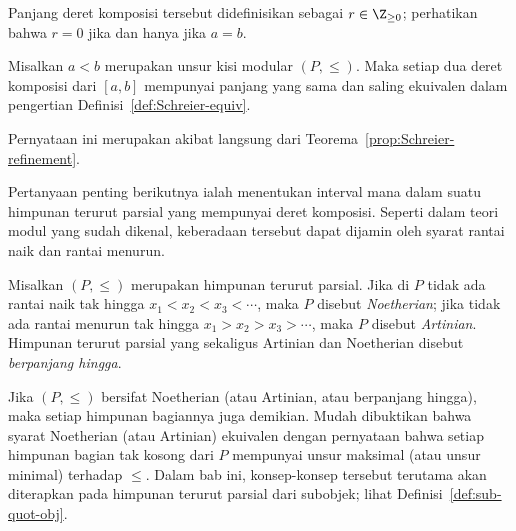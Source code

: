 Panjang deret komposisi tersebut didefinisikan sebagai $r \in \Z_{\geq 0}$;
perhatikan bahwa $r=0$ jika dan hanya jika $a=b$.

\begin{teorema}\label{prop:lattice-JH}
	Misalkan $a<b$ merupakan unsur kisi modular $(P,\leq)$. Maka setiap dua
	deret komposisi dari $[a,b]$ mempunyai panjang yang sama dan saling
	ekuivalen dalam pengertian Definisi~\ref{def:Schreier-equiv}.
\end{teorema}
\begin{bukti}
	Pernyataan ini merupakan akibat langsung dari
	Teorema~\ref{prop:Schreier-refinement}.
\end{bukti}

Pertanyaan penting berikutnya ialah menentukan interval mana dalam suatu
himpunan terurut parsial yang mempunyai deret komposisi. Seperti dalam teori modul yang
sudah dikenal, keberadaan tersebut dapat dijamin oleh syarat rantai naik dan
rantai menurun.

\begin{definisi}\label{def:lattice-Noether-Artin}
	Misalkan $(P,\leq)$ merupakan himpunan terurut parsial. Jika di $P$ tidak
	ada rantai naik tak hingga $x_1<x_2<x_3<\cdots$, maka $P$ disebut
	\emph{Noetherian}; jika tidak ada rantai menurun tak hingga
	$x_1>x_2>x_3>\cdots$, maka $P$ disebut \emph{Artinian}. Himpunan terurut
	parsial yang sekaligus Artinian dan Noetherian disebut
	\emph{berpanjang hingga}.
\end{definisi}

Jika $(P,\leq)$ bersifat Noetherian (atau Artinian, atau berpanjang hingga),
maka setiap himpunan bagiannya juga demikian. Mudah dibuktikan bahwa syarat
Noetherian (atau Artinian) ekuivalen dengan pernyataan bahwa setiap himpunan
bagian tak kosong dari $P$ mempunyai unsur maksimal (atau unsur minimal)
terhadap $\leq$. Dalam bab ini, konsep-konsep tersebut terutama akan diterapkan
pada himpunan terurut parsial dari subobjek; lihat
Definisi~\ref{def:sub-quot-obj}.

